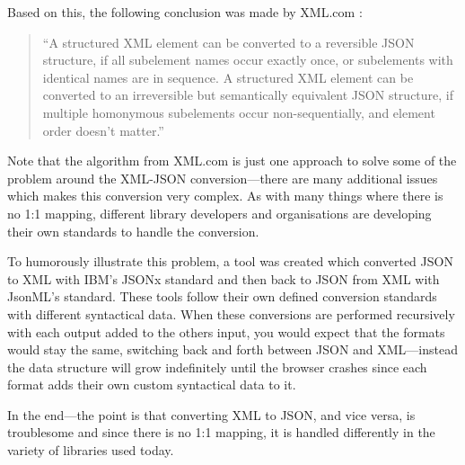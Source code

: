 \documentclass{cslthse-msc}
\begin{document}
\begin{appendices}
\vspace{5mm}
\noindent Based on this, the following conclusion was made by XML.com \cite{xml_json}:

\begin{quote}

\enquote{A structured XML element can be converted to a reversible JSON structure, if all subelement names occur exactly once, or subelements with identical names are in sequence. A structured XML element can be converted to an irreversible but semantically equivalent JSON structure, if multiple homonymous subelements occur non-sequentially, and element order doesn't matter.}

\end{quote}

Note that the algorithm from XML.com is just one approach to solve some of the problem around the XML-JSON conversion---there are many additional issues which makes this conversion very complex. As with many things where there is no 1:1 mapping, different library developers and organisations are developing their own standards to handle the conversion.

To humorously illustrate this problem, a tool was created \cite{jsonx_jsonml} which converted JSON to XML with IBM's JSONx \cite{jsonx} standard and then back to JSON from XML with JsonML's \cite{jsonml} standard. These tools follow their own defined conversion standards with different syntactical data. When these conversions are performed recursively with each output added to the others input, you would expect that the formats would stay the same, switching back and forth between JSON and XML---instead the data structure will grow indefinitely until the browser crashes since each format adds their own custom syntactical data to it.

In the end---the point is that converting XML to JSON, and vice versa, is troublesome and since there is no 1:1 mapping, it is handled differently in the variety of libraries used today.


\end{appendices}

\end{document}
